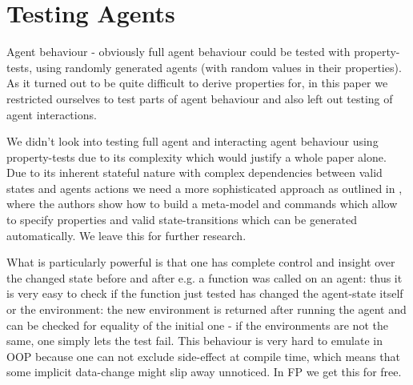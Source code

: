 \chapter{Testing Agents}
\label{ch:prop_agents}



Agent behaviour - obviously full agent behaviour could be tested with property-tests, using randomly generated agents (with random values in their properties). As it turned out to be quite difficult to derive properties for, in this paper we restricted ourselves to test parts of agent behaviour and also left out testing of agent interactions.

We didn't look into testing full agent and interacting agent behaviour using property-tests due to its complexity which would justify a whole paper alone. Due to its inherent stateful nature with complex dependencies between valid states and agents actions we need a more sophisticated approach as outlined in \cite{de_vries_-depth_2019}, where the authors show how to build a meta-model and commands which allow to specify properties and valid state-transitions which can be generated automatically. We leave this for further research.

What is particularly powerful is that one has complete control and insight over the changed state before and after e.g. a function was called on an agent: thus it is very easy to check if the function just tested has changed the agent-state itself or the environment: the new environment is returned after running the agent and can be checked for equality of the initial one - if the environments are not the same, one simply lets the test fail. This behaviour is very hard to emulate in OOP because one can not exclude side-effect at compile time, which means that some implicit data-change might slip away unnoticed. In FP we get this for free.

